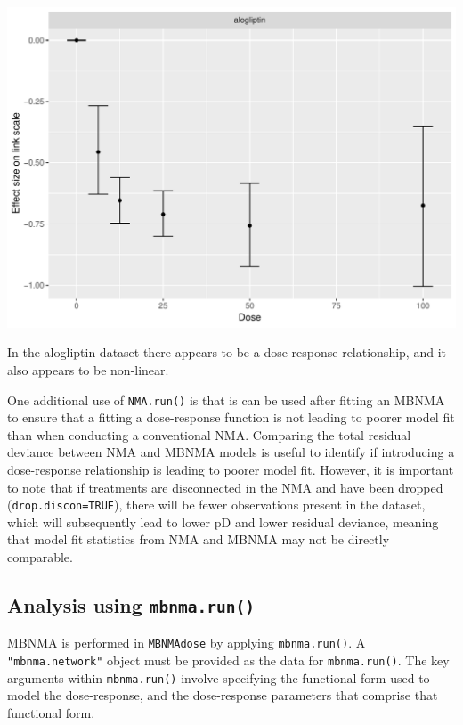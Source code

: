 \documentclass[]{article}
\begin{document}
\includegraphics{mbnmadose_files/figure-latex/unnamed-chunk-13-1.pdf}

In the alogliptin dataset there appears to be a dose-response
relationship, and it also appears to be non-linear.

One additional use of \texttt{NMA.run()} is that is can be used after
fitting an MBNMA to ensure that a fitting a dose-response function is
not leading to poorer model fit than when conducting a conventional NMA.
Comparing the total residual deviance between NMA and MBNMA models is
useful to identify if introducing a dose-response relationship is
leading to poorer model fit. However, it is important to note that if
treatments are disconnected in the NMA and have been dropped
(\texttt{drop.discon=TRUE}), there will be fewer observations present in
the dataset, which will subsequently lead to lower pD and lower residual
deviance, meaning that model fit statistics from NMA and MBNMA may not
be directly comparable.

\hypertarget{analysis-using-mbnma.run}{%
\subsection{\texorpdfstring{Analysis using
\texttt{mbnma.run()}}{Analysis using mbnma.run()}}\label{analysis-using-mbnma.run}}

MBNMA is performed in \texttt{MBNMAdose} by applying
\texttt{mbnma.run()}. A \texttt{"mbnma.network"} object must be provided
as the data for \texttt{mbnma.run()}. The key arguments within
\texttt{mbnma.run()} involve specifying the functional form used to
model the dose-response, and the dose-response parameters that comprise
that functional form.
\end{document}
